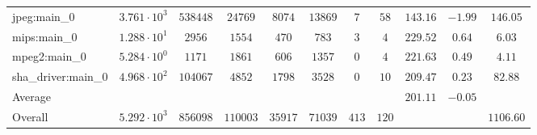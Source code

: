 \begin{tabular}{|l|c|c|c|c|c|c|c|c|c|c|}
jpeg:main\_0            & $ 3.761 \cdot 10^{3}  $ & $ 538448 $ & $ 24769  $ & $ 8074  $ & $ 13869 $ & $ 7   $ & $ 58  $ & $ 143.16      $ & $ -1.99   $ & $ 146.05  $ \\
mips:main\_0            & $ 1.288 \cdot 10^{1}  $ & $ 2956   $ & $ 1554   $ & $ 470   $ & $ 783   $ & $ 3   $ & $ 4   $ & $ 229.52      $ & $ 0.64    $ & $ 6.03    $ \\
mpeg2:main\_0           & $ 5.284 \cdot 10^{0}  $ & $ 1171   $ & $ 1861   $ & $ 606   $ & $ 1357  $ & $ 0   $ & $ 4   $ & $ 221.63      $ & $ 0.49    $ & $ 4.11    $ \\
sha\_driver:main\_0     & $ 4.968 \cdot 10^{2}  $ & $ 104067 $ & $ 4852   $ & $ 1798  $ & $ 3528  $ & $ 0   $ & $ 10  $ & $ 209.47      $ & $ 0.23    $ & $ 82.88   $ \\
\hline
Average                 & $                     $ & $        $ & $        $ & $       $ & $       $ & $     $ & $     $ & $ 201.11      $ & $ -0.05   $ & $         $ \\
\hline
Overall                 & $ 5.292 \cdot 10^{3}  $ & $ 856098 $ & $ 110003 $ & $ 35917 $ & $ 71039 $ & $ 413 $ & $ 120 $ & $             $ & $         $ & $ 1106.60 $ \\
\hline
\end{tabular}
